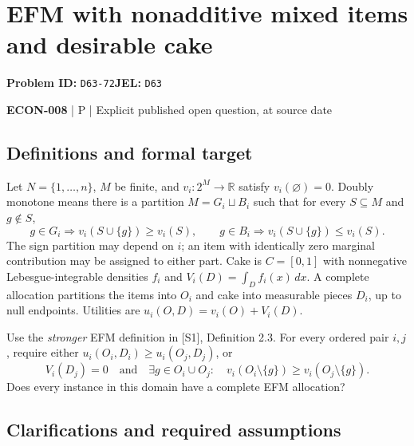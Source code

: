 \documentclass[11pt,a4paper]{article}
\begin{document}
\section*{EFM with nonadditive mixed items and desirable cake}
\textbf{Problem ID:} \texttt{D63-72}\quad \textbf{JEL:} \texttt{D63}\par
\label{problem:OP-0594}


\label{audited:ECON-008}

{\sffamily\small\color{muted}\textbf{ECON-008} | P | Explicit published open question, at source date\par}

\subsection*{Definitions and formal target}

Let $N=\{1,\ldots,n\}$, $M$ be finite, and $v_i:2^M\to\mathbb R$ satisfy $v_i(\varnothing)=0$. Doubly monotone means there is a partition $M=G_i\sqcup B_i$ such that for every $S\subseteq M$ and $g\notin S$,
\[
g\in G_i\Rightarrow v_i(S\cup\{g\})\geq v_i(S),\qquad
g\in B_i\Rightarrow v_i(S\cup\{g\})\leq v_i(S).
\]
The sign partition may depend on $i$; an item with identically zero marginal contribution may be assigned to either part. Cake is $C=[0,1]$ with nonnegative Lebesgue-integrable densities $f_i$ and $V_i(D)=\int_Df_i(x)\,dx$. A complete allocation partitions the items into $O_i$ and cake into measurable pieces $D_i$, up to null endpoints. Utilities are $u_i(O,D)=v_i(O)+V_i(D)$.

Use the \emph{stronger} EFM definition in [S1], Definition 2.3. For every ordered pair $i,j$, require either $u_i(O_i,D_i)\geq u_i(O_j,D_j)$, or
\[
 V_i(D_j)=0\quad\text{and}\quad
 \exists g\in O_i\cup O_j:\quad
 v_i(O_i\setminus\{g\})\geq v_i(O_j\setminus\{g\}).
\]
Does every instance in this domain have a complete EFM allocation?

\subsection*{Clarifications and required assumptions}
\end{document}
